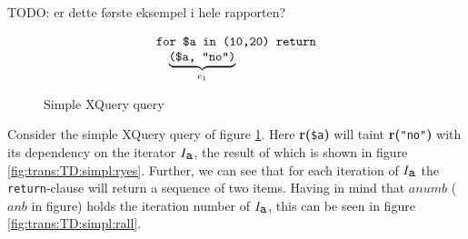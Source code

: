 TODO: er dette f\o rste eksempel i hele rapporten?
\begin{myExample}
\label{ex:trans:TD:simpleSeq}
\begin{figure}[h]
\begin{equation*}
\begin{array}{l}
\mbox{\texttt{for \$a in (10,20) return}} \\ \quad 
\underbrace{ \mbox{\texttt{(\$a, "no")}} }_{e_{1}}
\end{array}
\end{equation*}
\caption{Simple XQuery query}
\label{fig:trans:TD:simpQuery}
\end{figure}
Consider the simple XQuery query of figure \ref{fig:trans:TD:simpQuery}. Here \textbf{r(}\texttt{\$a}\textbf{)}
will taint \textbf{r(}\texttt{"no"}\textbf{)} with its dependency on the iterator $I_{\mbox{\texttt{a}}}$, the
result of which is shown in figure \ref{fig:trans:TD:simpl:ryes}. Further, we can see that for each iteration of
$I_{\mbox{\texttt{a}}}$ the \texttt{return}-clause will return a sequence of two items. Having in mind that
$anumb$ ($anb$ in figure) holds the iteration number of $I_{\mbox{\texttt{a}}}$, this can be seen in figure
\ref{fig:trans:TD:simpl:rall}.

\begin{figure}[!h]
\centering
{}
\qquad
{}
\qquad
{}


\end{figure}
\end{myExample}
